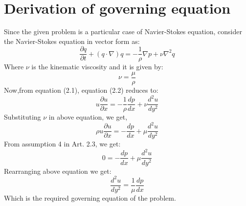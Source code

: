 \documentclass[14pt,one side, a4paper]{extbook}
\begin{document}
	 	\section{Derivation of governing equation}
	 	Since the given problem is a particular case of Navier-Stokes equation, consider the Navier-Stokes equation in vector form as:
	 	\begin{equation}
	 		\frac{\partial{q}}{\partial t} + ({q} \cdot \nabla){q} = -\frac{1}{\rho}\nabla p + \nu \nabla^2 {q}
	 	\end{equation}
	 	Where $\nu$ is the kinematic viscosity and it is given by:$$\nu=\frac{\mu}{\rho}$$ 
	 	Now,from equation (2.1), equation (2.2) reduces to:
	 	\begin{equation}
	 		u\frac{\partial{u}}{\partial{x}}=-\frac{1}{\rho}\frac{dp}{dx}+\nu\frac{d^{2}u}{dy^{2}}
	 	\end{equation}
	 	Substituting  $\nu$ in above equation, we get,
	 	\begin{equation}
	 	\rho u \frac{\partial u}{\partial x}=-\frac{dp}{dx}+\mu\frac{d^{2}u}{dy^{2}}
	 	\end{equation}
	 	From assumption 4 in Art. 2.3, we get:
	 	\begin{equation}
	 		0=-\frac{dp}{dx}+\mu\frac{d^{2}u}{dy^{2}}
	 	\end{equation}
	 	Rearranging above equation we get: 
	 	 \begin{equation}			
	 		\frac{d^{2}u}{dy^{2}}=\frac{1}{\mu}\frac{dp}{dx}
	 	\end{equation}
	 	Which is the required governing equation of the problem. 
	 	
\end{document}
